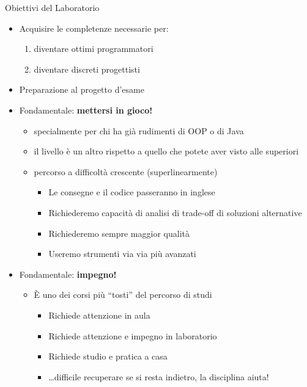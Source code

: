 \documentclass[xcolor=dvipsnames,presentation]{beamer}
\begin{document}
\begin{frame}{Obiettivi del Laboratorio}
    \begin{itemize}
        \item Acquisire le completenze necessarie per:
        \begin{enumerate}
            \item diventare ottimi programmatori
            \item diventare discreti progettisti
        \end{enumerate}
        \item Preparazione al progetto d'esame
        \item Fondamentale: \textbf{mettersi in gioco!}
        \begin{itemize}
            \item specialmente per chi ha già rudimenti di OOP o di Java
            \item il livello è un altro rispetto a quello che potete aver visto alle superiori
            \item percorso a difficoltà crescente (superlinearmente)
            \begin{itemize}
                \item Le consegne e il codice passeranno in inglese
                \item Richiederemo capacità di analisi di trade-off di soluzioni alternative
                \item Richiederemo sempre maggior qualità
                \item Useremo strumenti via via più avanzati
            \end{itemize}
        \end{itemize}
        \item Fondamentale: \textbf{impegno!}
        \begin{itemize}
            \item È uno dei corsi più ``tosti'' del percorso di studi
            \begin{itemize}
                \item Richiede attenzione in aula
                \item Richiede attenzione e impegno in laboratorio
                \item Richiede studio e pratica a casa
                \item \dots{}difficile recuperare se si resta indietro, la disciplina aiuta!
            \end{itemize}
        \end{itemize}
    \end{itemize}
\end{frame}
\end{document}

